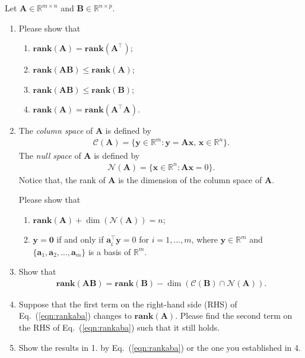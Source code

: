 \documentclass[11pt,letter,notitlepage]{article}
\renewcommand{\eqref}[1]{Eq.~(\ref{#1})}
\newcommand{\rank}[1]{ \textbf{rank}  (#1)  }
\theoremstyle{definition}
\begin{document}
	\begin{solution}
		
	\end{solution}
	
	\newpage
	\begin{exercise}
		Let $\mathbf{A} \in \mathbb{R}^{m\times n}$ and $\mathbf{B}\in \mathbb{R}^{n\times p}$.
		\begin{enumerate}
			\item Please show that
			\begin{enumerate}
				\item $\rank{\mathbf{A}} = \rank{\mathbf{A}^{\top}}$;
				\item $\rank{\mathbf{A}\mathbf{B}} \leq \rank{\mathbf{A}}$;
				\item $\rank{\mathbf{A}\mathbf{B}} \leq \rank{\mathbf{B}}$;
				\item $\rank{\mathbf{A}} = \rank{\mathbf{A}^{\top}  \mathbf{A}}$.
			\end{enumerate}
			\item The \emph{column space} of $\mathbf{A}$ is defined by
			\begin{align*}
				\mathcal{C}(\mathbf{A} ) = \{ \mathbf{y}\in \mathbb{R}^m : \mathbf{y} = \mathbf{Ax},\,\mathbf{x}\in\mathbb{R}^n\}.
			\end{align*}
			The \emph{null space} of $\mathbf{A}$ is defined by
			\begin{align*}
				\mathcal{N}(\mathbf{A})  = \{ \mathbf{x}\in \mathbb{R}^n : \mathbf{Ax}=0\}.
			\end{align*}
			Notice that, the rank of $\mathbf{A}$ is the dimension of the column space of $\mathbf{A}$.
			
			Please show that
			\begin{enumerate}
				\item $\rank{\mathbf{A}} + \dim ( \mathcal{N}( \mathbf{A} ) ) = n$;
				\item $\mathbf{y}=\mathbf{0}$ if and only if $\mathbf{a}_i^{\top}\mathbf{y}=0$ for $i=1,\ldots,m$, where $\mathbf{y}\in \mathbb{R}^m$ and  $\{\mathbf{a}_1,\mathbf{a}_2,\ldots,\mathbf{a}_m\}$ is a basis of $\mathbb{R}^m$.
			\end{enumerate}    
			\item Show that
			\begin{align}\label{eqn:rankaba}
				\rank{\mathbf{AB}}=\rank{\mathbf{B}}-\dim(\mathcal{C}(\mathbf{B})\cap \mathcal{N}(\mathbf{A})).
			\end{align}
			\item Suppose that the first term on the right-hand side (RHS) of \eqref{eqn:rankaba} changes to $\rank{\mathbf{A}}$. Please find the second term on the RHS of \eqref{eqn:rankaba} such that it still holds.
			\item Show the results in 1. by \eqref{eqn:rankaba} or the one you established in 4.
		\end{enumerate}
	\end{exercise}
	
\end{document}
